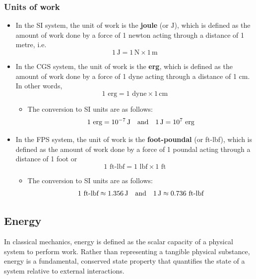 		\subsubsection{Units of work}
			\begin{itemize}
				\item In the SI system, the unit of work is the \textbf{joule} (or $\unit{\joule}$), which is defined as the amount of work done by a force of 1 newton acting through a distance of 1 metre, i.e. $$1\,\unit{\joule}=1\,\unit{\newton}\times 1\,\unit{\metre}$$
				
				\item  In the CGS system, the unit of work is the \textbf{erg}, which is defined as the amount of work done by a force of 1 dyne acting through a distance of 1 cm. In other words, $$1\text{ erg}=1\text{ dyne}\times 1\,\unit{\centi\metre}$$
				\begin{itemize}
					\item The conversion to SI units are as follows:
					\begin{align*}
						1\text{ erg}=\num{e-7}\,\unit{\joule}\qq{and}1\,\unit{\joule}=\num{e7}\text{ erg}
					\end{align*}
				\end{itemize}
				
				\item In the FPS system, the unit of work is the \textbf{foot-poundal} (or ft-lbf), which is defined as the amount of work done by a force of 1 poundal acting through a distance of 1 foot or $$1\text{ ft-lbf}=1\text{ lbf}\times 1\text{ ft}$$
				\begin{itemize}
					\item The conversion to SI units are as follows:
					\begin{align*}
						1\text{ ft-lbf}\approx 1.356\,\unit{\joule}\qq{and}1\,\unit{\joule}\approx 0.736\text{ ft-lbf}
					\end{align*}
				\end{itemize}
			\end{itemize}
	
	\subsection{Energy}
		In classical mechanics, energy is defined as the scalar capacity of a physical system to perform work. Rather than representing a tangible physical substance, energy is a fundamental, conserved state property that quantifies the state of a system relative to external interactions.
		
